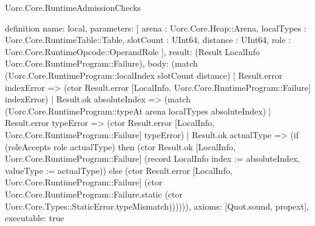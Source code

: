 \begin{lexlean}{Uorc.Core.RuntimeAdmissionChecks}
\begin{semanticmodule}
definition{
  name: local,
  parameters: [
    arena : Uorc.Core.Heap::Arena,
    localTypes : Uorc.Core.RuntimeTable::Table,
    slotCount : UInt64,
    distance : UInt64,
    role : Uorc.Core.RuntimeOpcode::OperandRole
  ],
  result: (Result LocalInfo Uorc.Core.RuntimeProgram::Failure),
  body: (match (Uorc.Core.RuntimeProgram::localIndex slotCount distance)
    | Result.error indexError => (ctor Result.error [LocalInfo, Uorc.Core.RuntimeProgram::Failure] indexError)
    | Result.ok absoluteIndex => (match (Uorc.Core.RuntimeProgram::typeAt arena localTypes absoluteIndex)
      | Result.error typeError => (ctor Result.error [LocalInfo, Uorc.Core.RuntimeProgram::Failure] typeError)
      | Result.ok actualType => (if (roleAccepts role actualType) then (ctor Result.ok [LocalInfo, Uorc.Core.RuntimeProgram::Failure] (record LocalInfo {index := absoluteIndex, valueType := actualType})) else (ctor Result.error [LocalInfo, Uorc.Core.RuntimeProgram::Failure] (ctor Uorc.Core.RuntimeProgram::Failure.static (ctor Uorc.Core.Types::StaticError.typeMismatch)))))),
  axioms: [Quot.sound, propext],
  executable: true
}


\end{semanticmodule}
\end{lexlean}
